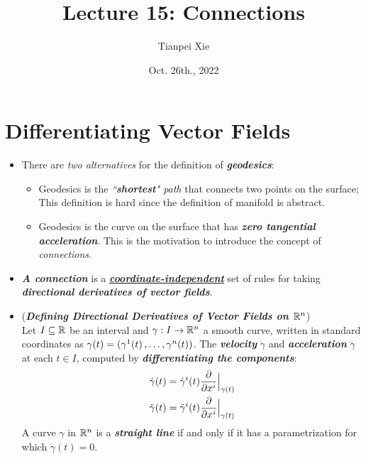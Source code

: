 \documentclass[11pt]{article}
\begin{document}
\title{Lecture 15: Connections}
\author{ Tianpei Xie}
\date{Oct. 26th., 2022}
\maketitle
\tableofcontents
\newpage
\section{Differentiating Vector Fields}
\begin{itemize}
\item \begin{remark}
There are \emph{two alternatives} for the definition of \emph{\textbf{geodesics}}:
\begin{itemize}
\item Geodesics is the \emph{``\textbf{shortest}" path} that connects two points on the surface; This definition is hard since the definition of manifold is abstract. 
\item Geodesics is the curve on the surface that has \emph{\textbf{zero tangential acceleration}}. This is the motivation to introduce the concept of \emph{connections}.
\end{itemize} 
\end{remark}

\item \begin{remark}
\emph{\textbf{A connection}} is a \underline{\emph{\textbf{coordinate-independent}}} set of rules for taking \emph{\textbf{directional derivatives of vector fields}}.
\end{remark}

\item \begin{remark} (\emph{\textbf{Defining Directional Derivatives of Vector Fields on ${\mathbb R}^n$}}) \citep{lee2018introduction}\\
Let $I \subseteq {\mathbb R}$ be an interval and  $\gamma: I \rightarrow {\mathbb R}^n$ a smooth curve, written in standard coordinates as $\gamma(t)= (\gamma^1(t) \,{,}\ldots{,}\, \gamma^n(t))$. The \emph{\textbf{velocity}} $\dot{\gamma}$ and \emph{\textbf{acceleration}} $\ddot{\gamma}$ at each $t \in I$, computed by \emph{\textbf{differentiating the components}}:
\begin{align}
\dot\gamma(t) &= \dot{\gamma}^i(t)\frac{\partial }{ \partial x^i}\Bigr|_{\gamma(t)} \label{eqn: curve_vel_euclidean}\\
\ddot\gamma(t) &= \ddot{\gamma}^i(t)\frac{\partial }{ \partial x^i}\Bigr|_{\gamma(t)} \label{eqn: curve_acc_euclidean}
\end{align} A curve $\gamma$ in ${\mathbb R}^n$ is a \emph{\textbf{straight line}} if and only if it has a parametrization for which $\ddot{\gamma}(t) = 0$.


\end{remark}
\end{itemize}
\end{document}
